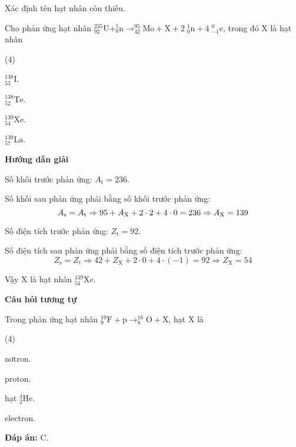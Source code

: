 \begin{dang}{Xác định tên hạt nhân còn thiếu.}

{
Cho phản ứng hạt nhân $^{235}_{92} \text{U} + ^{1}_{0} \text{n} \longrightarrow ^{95}_{42} \text{Mo} + \text{X} + 2 \; ^{1}_{0} \text{n} + 4 \; ^{0}_{-1} \text{e}$, trong đó X là hạt nhân
		\begin{mcq}(4)
			\item $^{138}_{53} \text{I}$.
			\item $^{138}_{52} \text{Te}$.
			\item $^{139}_{54} \text{Xe}$.
			\item $^{139}_{57} \text{La}$.
		\end{mcq}
}
{
\begin{center}
	\textbf{Hướng dẫn giải}
\end{center}

Số khối trước phản ứng: $A_\text{t} = 236$.
		
		Số khối sau phản ứng phải bằng số khối trước phản ứng:
		$$A_\text{s} = A_\text{t} \Rightarrow 95+A_\text X+2\cdot 2 + 4 \cdot 0 = 236 \Rightarrow A_\text X = 139$$
		
		Số điện tích trước phản ứng: $Z_\text{t} = 92$.
		
		Số điện tích sau phản ứng phải bằng số điện tích trước phản ứng:
		$$Z_\text{s} = Z_\text{t} \Rightarrow 42 + Z_\text{X} + 2 \cdot 0 + 4 \cdot(-1) = 92 \Rightarrow Z_\text{X} = 54$$
		
		Vậy X là hạt nhân $ ^{139}_{54} \text{Xe}$.
		
\begin{center}
	\textbf{Câu hỏi tương tự}
\end{center}

Trong phản ứng hạt nhân $^{19}_{9} \text{F} + \text{p} \longrightarrow ^{16}_{8} \text{O} + \text{X}$, hạt X là
		\begin{mcq}(4)
			\item nơtron. 
			\item proton. 
			\item hạt $^{4}_{2} \text{He}$. 
			\item electron.
		\end{mcq}
\textbf{Đáp án:} C.
}


\end{dang}
